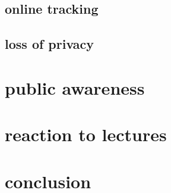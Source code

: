 \documentclass[10pt,a4paper,]{article}
\begin{document}
\subsection{online tracking}
\subsection{loss of privacy}
\section{public awareness} 
\section{reaction to lectures}
\section{conclusion} 






\end{document}
